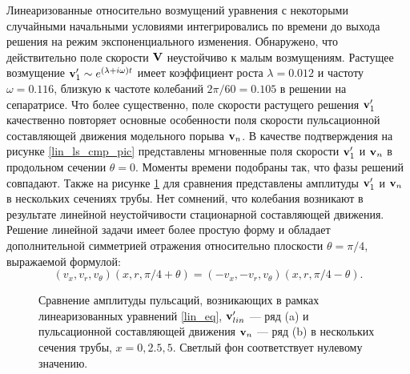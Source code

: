 Линеаризованные относительно возмущений уравнения с некоторыми случайными начальными условиями интегрировались по времени до выхода решения на режим экспоненциального изменения. Обнаружено, что действительно поле скорости $\mathbf{V}$ неустойчиво к малым возмущениям. Растущее возмущение $\mathbf{v}'_1 \sim e^{(\lambda+i\omega)t}$ имеет коэффициент роста $\lambda=0.012$ и частоту $\omega=0.116$, близкую к частоте колебаний $2\pi/60=0.105$ в решении на сепаратрисе. Что более существенно, поле скорости растущего решения $\mathbf{v}'_1$ качественно повторяет основные особенности поля скорости пульсационной составляющей движения модельного порыва $\mathbf{v}_n$. В качестве подтверждения на рисунке \ref{lin_ls_cmp_pic} представлены мгновенные поля скорости $\mathbf{v}'_1$ и $\mathbf{v}_n$ в продольном сечении $\theta = 0$. Моменты времени подобраны так, что фазы решений совпадают. Также на рисунке \ref{lin_amp_cmp_pic} для сравнения представлены амплитуды $\mathbf{v}_1'$ и $\mathbf{v}_n$ в нескольких сечениях трубы. Нет сомнений, что колебания возникают в результате линейной неустойчивости стационарной составляющей движения. Решение линейной задачи имеет более простую форму и обладает дополнительной симметрией отражения относительно плоскости $\theta = \pi/4$, выражаемой формулой:
\begin{equation} \label{dop_sym_eq}
(v_x, v_r, v_\theta)(x, r, \pi/4 + \theta) = (- v_x, - v_r, v_\theta)(x, r, \pi/4 - \theta). 
\end{equation} 

\begin{figure}
\caption{Сравнение амплитуды пульсаций, возникающих в рамках линеаризованных уравнений \eqref{lin_eq}, $\mathbf{v}'_{lin}$ --- ряд (a) и пульсационной составляющей движения $\mathbf{v}_n$ --- ряд (b) в нескольких сечения трубы, $x = 0, 2.5, 5$. Светлый фон соответствует нулевому значению.}
\label{lin_amp_cmp_pic}
\end{figure}

